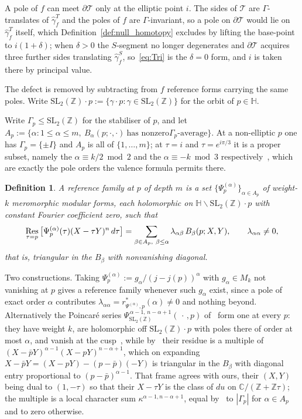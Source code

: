 \documentclass[11pt]{article}
\newtheorem{definition}[theorem]{Definition}
\newcommand{\HH}{\mathbb{H}}
\newcommand{\ZZ}{\mathbb{Z}}
\newcommand{\CC}{\mathbb{C}}
\newcommand{\SLZ}{\mathrm{SL}_2(\ZZ)}
\begin{document}
A pole of $f$ can meet $\partial\mathcal{T}$ only at the elliptic point $i$. The sides of
$\mathcal{T}$ are $\Gamma$-translates of $\hat\gamma^T_f$ and the poles of $f$ are
$\Gamma$-invariant, so a pole on $\partial\mathcal{T}$ would lie on $\hat\gamma^T_f$ itself, which
Definition~\ref{def:null_homotopy} excludes by lifting the base-point to $i(1+\delta)$; when
$\delta>0$ the $S$-segment no longer degenerates and $\partial\mathcal{T}$ acquires three further
sides translating $\hat\gamma^S_f$, so~\eqref{eq:Tri} is the $\delta=0$ form, and $i$ is taken
there by principal value.

The defect is removed by subtracting from $f$ reference forms carrying the same poles. Write
$\SLZ\!\cdot\!p:=\{\gamma\cdot p:\gamma\in\SLZ\}$ for the orbit of $p\in\HH$.

Write $\Gamma_p\le\SLZ$ for the stabiliser of $p$, and let
$A_p:=\{\alpha:1\le\alpha\le m,\ B_\alpha(p;\cdot,\cdot)\ \text{has nonzero
}\Gamma_p\text{-average}\}$. At a non-elliptic $p$ one has $\Gamma_p=\{\pm I\}$ and $A_p$ is all of
$\{1,\dots,m\}$; at $\tau=i$ and $\tau=e^{i\pi/3}$ it is a proper subset, namely the
$\alpha\equiv k/2\bmod2$ and the $\alpha\equiv-k\bmod3$ respectively~\cite{VerifyScripts}, which are
exactly the pole orders the valence formula permits there.

\begin{definition}\label{def:reffam}
A \emph{reference family} at $p$ of depth $m$ is a set $\{\Psi^{(\alpha)}_p\}_{\alpha\in A_p}$ of
weight-$k$ meromorphic modular forms, each holomorphic on $\HH\smallsetminus\SLZ\!\cdot\!p$ with
constant Fourier coefficient zero, such that
\begin{equation}\label{eq:psiform}
\mathop{\rm Res}_{\tau=p}\big[\Psi^{(\alpha)}_p(\tau)(X-\tau Y)^n\,d\tau\big]
=\sum_{\beta\in A_p,\ \beta\le\alpha}\lambda_{\alpha\beta}\,B_\beta(p;X,Y),
\qquad \lambda_{\alpha\alpha}\neq0 ,
\end{equation}
that is, triangular in the $B_\beta$ with nonvanishing diagonal.
\end{definition}

Two constructions. Taking $\Psi^{(\alpha)}_p:=g_\alpha/(j-j(p))^{\alpha}$ with $g_\alpha\in M_k$ not
vanishing at $p$ gives a reference family whenever such $g_\alpha$ exist, since a pole of exact
order $\alpha$ contributes $\lambda_{\alpha\alpha}=r^*_{\Psi^{(\alpha)},p}(\alpha)\neq0$ and nothing
beyond. Alternatively the Poincar\'e series
$\Psi^{\,\alpha-1,\,n-\alpha+1}_{\SLZ}(\,\cdot\,,p)$ of~\cite[Def.\ 3.1]{BrownFonseca2025} form one
at every $p$: they have weight $k$, are holomorphic off $\SLZ\!\cdot\!p$ with poles there of order
at most $\alpha$, and vanish at the cusp~\cite[Prop.\ 3.3]{BrownFonseca2025}, while
by~\cite[Cor.\ 3.11]{BrownFonseca2025} their residue is a multiple of
$(X-\bar pY)^{\alpha-1}(X-pY)^{n-\alpha+1}$, which on expanding
$X-\bar pY=(X-pY)-(p-\bar p)(-Y)$ is triangular in the $B_\beta$ with diagonal entry proportional to
$(p-\bar p)^{\alpha-1}$. That frame agrees with ours, their $(X,Y)$ being dual to $(1,-\tau)$ so
that their $X-\tau Y$ is the class of $du$ on $\CC/(\ZZ+\ZZ\tau)$; the multiple is a local character
sum $\kappa^{\alpha-1,n-\alpha+1}$, equal by~\cite[Rem.\ 3.12]{BrownFonseca2025} to $|\Gamma_p|$ for
$\alpha\in A_p$ and to zero otherwise.
\end{document}
